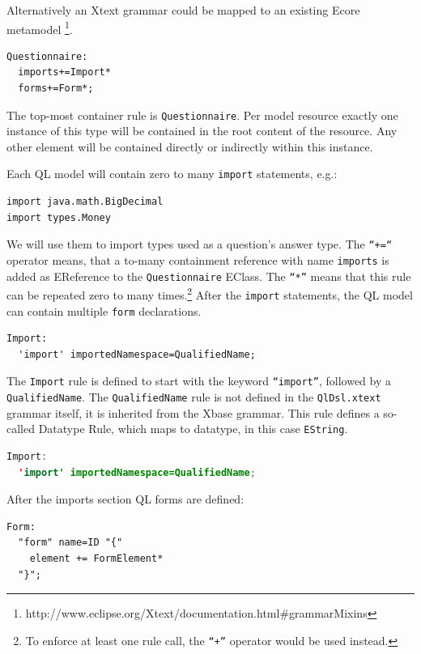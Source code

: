 Alternatively an Xtext grammar could be mapped to an existing Ecore metamodel
\footnote{http://www.eclipse.org/Xtext/documentation.html\#grammarMixins}.


\begin{lstlisting}[language=Xtext]
Questionnaire:
  imports+=Import*
  forms+=Form*;
\end{lstlisting}

The top-most container rule is \texttt{Questionnaire}. Per model resource
exactly one instance of this type will be contained in the root content of the
resource. Any other element will be contained directly or indirectly within this
instance.

Each QL model will contain zero to many \texttt{import} statements, e.g.: 
\begin{lstlisting}[language=QL]
import java.math.BigDecimal
import types.Money
\end{lstlisting}

We will use them to
import types used as a question's answer type. The \texttt{``+=``} operator means, that
a to-many containment reference with name \texttt{imports} is added as EReference to the
\texttt{Questionnaire} EClass. The \texttt{``*''} means that this rule can be
repeated zero to many times.\footnote{To enforce at least one rule call, the
\texttt{``+''} operator would be used instead.}
After the \texttt{import} statements, the QL model can contain multiple \texttt{form}
declarations.

\begin{lstlisting}[language=Xtext]
Import:
  'import' importedNamespace=QualifiedName;
\end{lstlisting}

The \texttt{Import} rule is defined to start with the keyword
\texttt{``import''}, followed by a \texttt{QualifiedName}. The \texttt{QualifiedName} rule is not
defined in the \texttt{QlDsl.xtext} grammar itself, it is inherited from the Xbase
grammar. This rule defines a so-called Datatype Rule, which maps to datatype,
in this case \texttt{EString}.

\begin{lstlisting}[language=Java]
Import:
  'import' importedNamespace=QualifiedName;
\end{lstlisting}

After the imports section QL forms are defined:

\begin{lstlisting}[language=Xtext]
Form:
  "form" name=ID "{"
    element += FormElement*
  "}";
\end{lstlisting}


